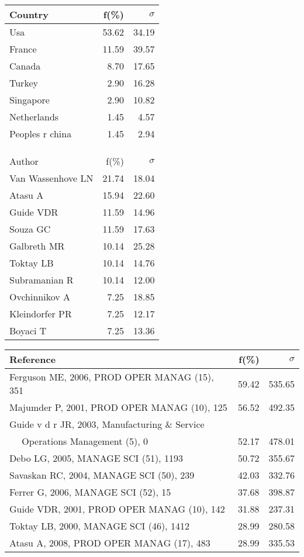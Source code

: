 \documentclass[a4paper,11pt]{report}
\begin{document}
\begin{landscape}
\begin{table}[!ht]
{\begin{tabular}{|l r r|}
Country & f(\%) & $\sigma$\\
\hline
Usa & 53.62 & 34.19\\
France & 11.59 & 39.57\\
Canada & 8.70 & 17.65\\
Turkey & 2.90 & 16.28\\
Singapore & 2.90 & 10.82\\
Netherlands & 1.45 & 4.57\\
Peoples r china & 1.45 & 2.94\\
 &  & \\
 &  & \\
 &  & \\
\hline
\hline
Author & f(\%) & $\sigma$\\
\hline
Van Wassenhove LN & 21.74 & 18.04\\
Atasu A & 15.94 & 22.60\\
Guide VDR & 11.59 & 14.96\\
Souza GC & 11.59 & 17.63\\
Galbreth MR & 10.14 & 25.28\\
Toktay LB & 10.14 & 14.76\\
Subramanian R & 10.14 & 12.00\\
Ovchinnikov A & 7.25 & 18.85\\
Kleindorfer PR & 7.25 & 12.17\\
Boyaci T & 7.25 & 13.36\\
\hline
\end{tabular}
}
{\scriptsize\begin{tabular}{|l r r|}
\hline
Reference & f(\%) & $\sigma$\\
\hline
Ferguson ME, 2006, PROD OPER MANAG (15), 351 & 59.42 & 535.65\\
Majumder P, 2001, PROD OPER MANAG (10), 125 & 56.52 & 492.35\\
Guide v d r  JR, 2003, Manufacturing \& Service &  & \\
$\quad$ Operations Management (5), 0 & 52.17 & 478.01\\
Debo LG, 2005, MANAGE SCI (51), 1193 & 50.72 & 355.67\\
Savaskan RC, 2004, MANAGE SCI (50), 239 & 42.03 & 332.76\\
Ferrer G, 2006, MANAGE SCI (52), 15 & 37.68 & 398.87\\
Guide VDR, 2001, PROD OPER MANAG (10), 142 & 31.88 & 237.31\\
Toktay LB, 2000, MANAGE SCI (46), 1412 & 28.99 & 280.58\\
Atasu A, 2008, PROD OPER MANAG (17), 483 & 28.99 & 335.53\\

\end{tabular}}
\end{table}
\end{landscape}
\end{document}
